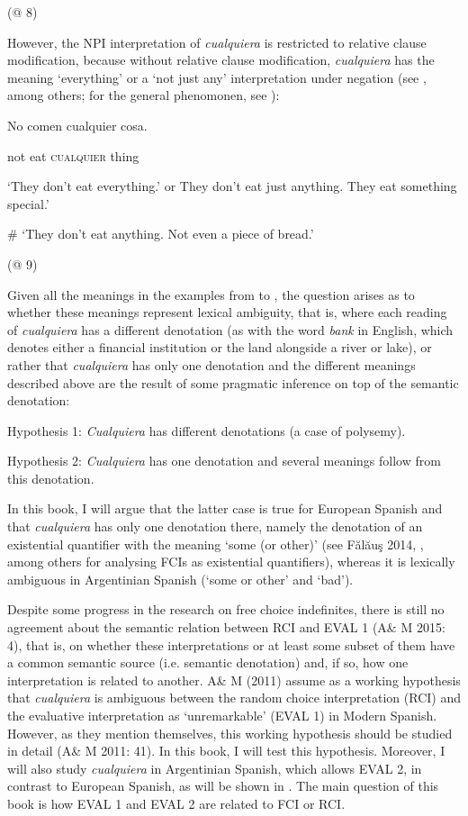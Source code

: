 \documentclass[output=paper]{langscibook}
\begin{document}
    (@ 8)

However, the NPI interpretation of \textit{cualquiera} is restricted to relative clause modification, because without relative clause modification, \textit{cualquiera} has the meaning ‘everything’ or a ‘not just any’ interpretation under negation (see \citealt{Arregui2006}, among others; for the general phenomonen, see \citealt{Chierchia2006}):

    No  comen  cualquier  cosa.

    not  eat  \textsc{cualquier}  thing

    ‘They don’t eat everything.’ or They don’t eat just anything. They eat something special.’

    \# ‘They don’t eat anything. Not even a piece of bread.’

    (@ 9)

Given all the meanings in the examples from  to , the question arises as to whether these meanings represent lexical ambiguity, that is, where each reading of \textit{cualquiera} has a different denotation (as with the word \textit{bank} in English, which denotes either a financial institution or the land alongside a river or lake), or rather that \textit{cualquiera} has only one denotation and the different meanings described above are the result of some pragmatic inference on top of the semantic denotation:

    Hypothesis 1: \textit{Cualquiera} has different denotations (a case of polysemy).

    Hypothesis 2: \textit{Cualquiera} has one denotation and several meanings follow from this denotation.

In this book, I will argue that the latter case is true for European Spanish and that \textit{cualquiera} has only one denotation there, namely the denotation of an existential quantifier with the meaning ‘some (or other)’ (see Fălăuş 2014, \citealt{Aloni2021}, among others for analysing FCIs as existential quantifiers), whereas it is lexically ambiguous in Argentinian Spanish (‘some or other’ and ‘bad’).

  Despite some progress in the research on free choice indefinites, there is still no agreement about the semantic relation between RCI and EVAL 1 (A\& M 2015: 4), that is, on whether these interpretations or at least some subset of them have a common semantic source (i.e. semantic denotation) and, if so, how one interpretation is related to another. A\& M (2011) assume as a working hypothesis that \textit{cualquiera} is ambiguous between the random choice interpretation (RCI) and the evaluative interpretation as ‘unremarkable’ (EVAL 1) in Modern Spanish. However, as they mention themselves, this working hypothesis should be studied in detail (A\& M 2011: 41). In this book, I will test this hypothesis. Moreover, I will also study \textit{cualquiera} in Argentinian Spanish, which allows EVAL 2, in contrast to European Spanish, as will be shown in . The main question of this book is how EVAL 1 and EVAL 2 are related to FCI or RCI. 
\end{document}
